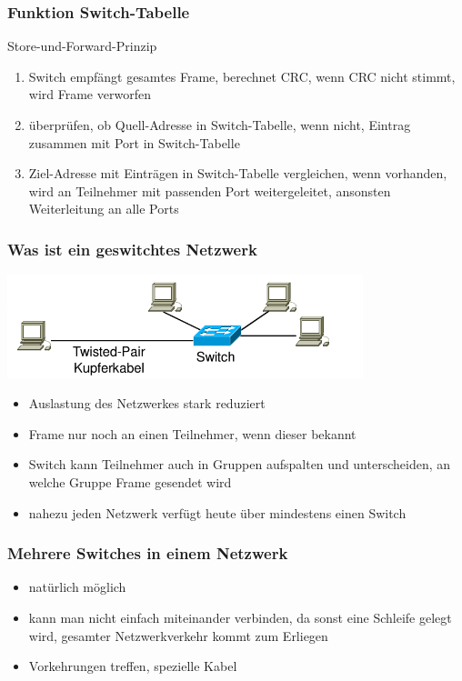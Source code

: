 \documentclass{beamer}
\begin{document}
    	\begin{frame}
	       	\frametitle{Funktion Switch-Tabelle}
	       	Store-und-Forward-Prinzip
	       	\begin{enumerate}
	       	\item Switch empfängt gesamtes Frame, berechnet CRC, wenn CRC nicht stimmt, wird Frame verworfen
	       	\item überprüfen, ob Quell-Adresse in Switch-Tabelle, wenn nicht, Eintrag zusammen mit Port in Switch-Tabelle
	       	\item Ziel-Adresse mit Einträgen in Switch-Tabelle vergleichen, wenn vorhanden, wird an Teilnehmer mit passenden Port weitergeleitet, ansonsten Weiterleitung an alle Ports
	       	\end{enumerate}  	
	   	\end{frame}
    	
        \begin{frame}
        	\frametitle{Was ist ein geswitchtes Netzwerk}
        	\includegraphics[height=3.0cm]{geswitchtes_netz.png}\\
        	\begin{itemize}
        	\item Auslastung des Netzwerkes stark reduziert
        	\item Frame nur noch an einen Teilnehmer, wenn dieser bekannt
        	\item Switch kann Teilnehmer auch in Gruppen aufspalten und unterscheiden, an welche Gruppe Frame gesendet wird
        	\item nahezu jeden Netzwerk verfügt heute über mindestens einen Switch
        	\end{itemize} 	
    	\end{frame}
    	
    	\begin{frame}
	       	\frametitle{Mehrere Switches in einem Netzwerk}
	       	\begin{itemize}
	       	\item natürlich möglich
	       	\item kann man nicht einfach miteinander verbinden, da sonst eine Schleife gelegt wird, gesamter Netzwerkverkehr kommt zum Erliegen
	       	\item Vorkehrungen treffen, spezielle Kabel
	       	\end{itemize} 	
	   	\end{frame}
    	
\end{document}
